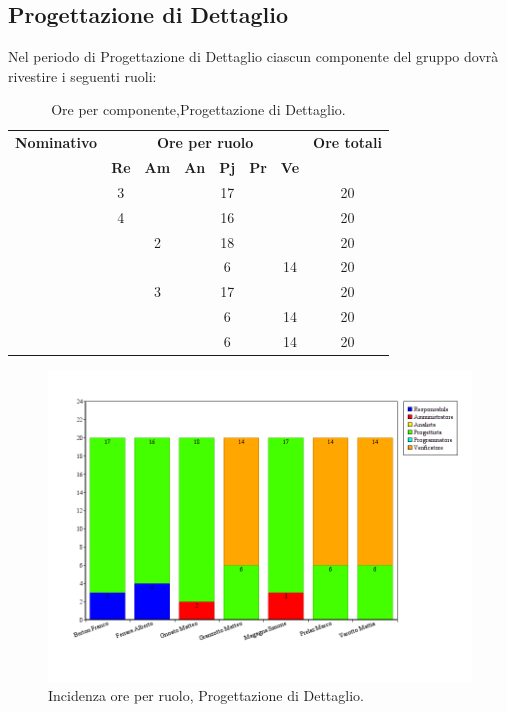 \subsection{Progettazione di Dettaglio}
Nel periodo di Progettazione di Dettaglio ciascun componente del gruppo dovrà rivestire i seguenti ruoli:
\begin{table}[H]
	\begin{center}
		\begin{tabular}{|c|c|c|c|c|c|c|c|}
			\hline
			\textbf{Nominativo} & \multicolumn{6}{c|}{\textbf{Ore per ruolo}} & \textbf{Ore totali} \\
			& \textbf{Re} & \textbf{Am} & \textbf{An} & \textbf{Pj} & \textbf{Pr} & \textbf{Ve} & \\
			\hline
			\FB		&	3	&		&		&	17	&		&		&	20	\\ 
			\hline
			\AF		&	4	&		&		&	16	&		&		& 	20	\\ 
			\hline
			\GN		&		&	2	&		&	18	&		&		&	20	\\ 
			\hline									
			\GR	&		&	 	&		&	6	&	 	& 	14	&	20	\\
			\hline
			\SM 		&		&	3	&		&	17	&		& 		&	20	\\ 
			\hline
			\MP 		& 		&		&		&	6	&		&	14	&	20	\\ 
			\hline
			\MV 		&		&		&		&	6	&		&	14	& 	20	\\ 
			\hline
		\end{tabular}
	\end{center}
	\caption{Ore per componente,Progettazione di Dettaglio.}
\end{table}

\begin{figure}[H]
	\centering
	\includegraphics[scale=0.4]{immagini/Grafi/GrafoPD}
	\caption{Incidenza ore per ruolo, Progettazione di Dettaglio.}
\end{figure}

